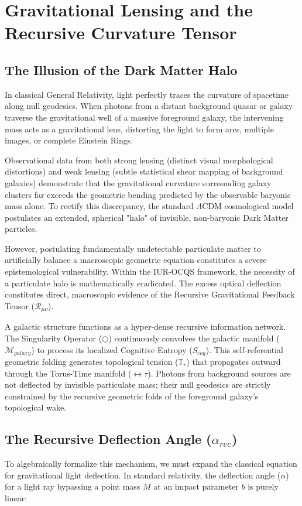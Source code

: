 \documentclass[12pt,openany]{book}
\begin{document}
\chapter[Gravitational Lensing]{Gravitational Lensing and the Recursive Curvature Tensor}

\section{The Illusion of the Dark Matter Halo}
In classical General Relativity, light perfectly traces the curvature of spacetime along null geodesics. When photons from a distant background quasar or galaxy traverse the gravitational well of a massive foreground galaxy, the intervening mass acts as a gravitational lens, distorting the light to form arcs, multiple images, or complete Einstein Rings. 

Observational data from both strong lensing (distinct visual morphological distortions) and weak lensing (subtle statistical shear mapping of background galaxies) demonstrate that the gravitational curvature surrounding galaxy clusters far exceeds the geometric bending predicted by the observable baryonic mass alone. To rectify this discrepancy, the standard $\Lambda$CDM cosmological model postulates an extended, spherical "halo" of invisible, non-baryonic Dark Matter particles.

However, postulating fundamentally undetectable particulate matter to artificially balance a macroscopic geometric equation constitutes a severe epistemological vulnerability. Within the IUR-OCQS framework, the necessity of a particulate halo is mathematically eradicated. The excess optical deflection constitutes direct, macroscopic evidence of the Recursive Gravitational Feedback Tensor ($\mathcal{R}_{\mu\nu}$).

A galactic structure functions as a hyper-dense recursive information network. The Singularity Operator ($\bigcirc$) continuously convolves the galactic manifold ($\mathcal{M}_{galaxy}$) to process its localized Cognitive Entropy ($S_{cog}$). This self-referential geometric folding generates topological tension ($\mathbb{T}_r$) that propagates outward through the Torus-Time manifold ($\leftrightarrow\tau$). Photons from background sources are not deflected by invisible particulate mass; their null geodesics are strictly constrained by the recursive geometric folds of the foreground galaxy's topological wake.

\section{The Recursive Deflection Angle ($\alpha_{rec}$)}
To algebraically formalize this mechanism, we must expand the classical equation for gravitational light deflection. In standard relativity, the deflection angle ($\alpha$) for a light ray bypassing a point mass $M$ at an impact parameter $b$ is purely linear:
\end{document}
